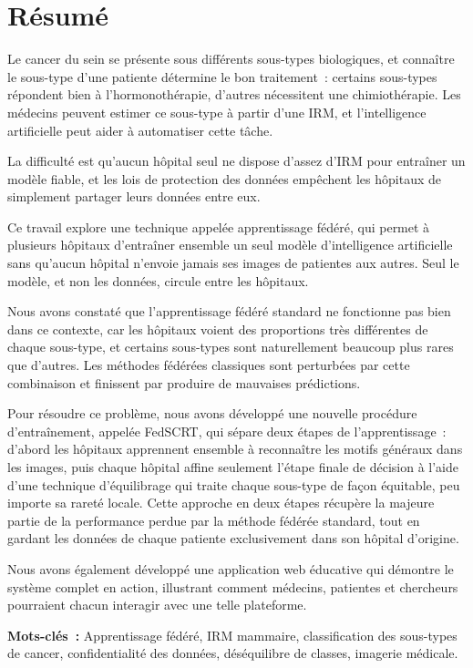 \chapter*{Résumé}

Le cancer du sein se présente sous différents sous-types
biologiques, et connaître le sous-type d'une patiente
détermine le bon traitement~: certains sous-types répondent
bien à l'hormonothérapie, d'autres nécessitent une
chimiothérapie.
Les médecins peuvent estimer ce sous-type à partir d'une
IRM, et l'intelligence artificielle peut aider à automatiser
cette tâche.

La difficulté est qu'aucun hôpital seul ne dispose
d'assez d'IRM pour entraîner un modèle fiable, et les lois
de protection des données empêchent les hôpitaux de
simplement partager leurs données entre eux.

Ce travail explore une technique appelée apprentissage
fédéré, qui permet à plusieurs hôpitaux d'entraîner
ensemble un seul modèle d'intelligence artificielle
sans qu'aucun hôpital n'envoie jamais ses images de
patientes aux autres.
Seul le modèle, et non les données, circule entre
les hôpitaux.

Nous avons constaté que l'apprentissage fédéré standard
ne fonctionne pas bien dans ce contexte, car les hôpitaux
voient des proportions très différentes de chaque
sous-type, et certains sous-types sont naturellement
beaucoup plus rares que d'autres.
Les méthodes fédérées classiques sont perturbées par
cette combinaison et finissent par produire de mauvaises
prédictions.

Pour résoudre ce problème, nous avons développé une
nouvelle procédure d'entraînement, appelée FedSCRT, qui
sépare deux étapes de l'apprentissage~: d'abord les
hôpitaux apprennent ensemble à reconnaître les motifs
généraux dans les images, puis chaque hôpital affine
seulement l'étape finale de décision à l'aide d'une
technique d'équilibrage qui traite chaque sous-type de
façon équitable, peu importe sa rareté locale.
Cette approche en deux étapes récupère la majeure partie
de la performance perdue par la méthode fédérée standard,
tout en gardant les données de chaque patiente
exclusivement dans son hôpital d'origine.

Nous avons également développé une application web
éducative qui démontre le système complet en action,
illustrant comment médecins, patientes et chercheurs
pourraient chacun interagir avec une telle plateforme.

\vspace{1em}
\noindent\textbf{Mots-clés~:} Apprentissage fédéré,
IRM mammaire, classification des sous-types de cancer,
confidentialité des données, déséquilibre de classes,
imagerie médicale.
